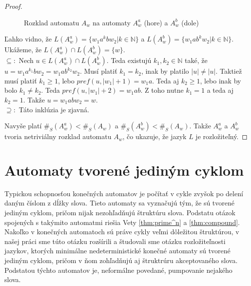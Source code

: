 \begin{proof}
\begin{figure}[H]
\caption{Rozklad automatu $ A_w $ na automaty $ A_w^a $ (hore) a $ A_w^b $ (dole)}
\end{figure}

Ľahko vidno, že $ L(A_w^a) = \lbrace w_1a^kbw_2 | k \in \mathbb{N} \rbrace $ a $ L(A_w^b) = \lbrace w_1ab^kw_2 | k \in \mathbb{N} \rbrace$. Ukážeme, že $ L(A_w^a) \cap L(A_w^b) = \lbrace w \rbrace $. \\ 
$ \subseteq: $ Nech $ u \in L(A_w^a) \cap L(A_w^b)  $. Teda existujú $ k_1,k_2 \in \mathbb{N} $ také, že $ u = w_1a^{k_1}bw_2 = w_1ab^{k_2}w_2 $. Musí platiť $ k_1 = k_2 $, inak by platilo $ |u| \neq |u| $. Taktiež musí platiť $ k_1 \geq 1 $, lebo $ pref(u,|w_1|+1) = w_1a $. Teda aj $ k_2 \geq 1 $, lebo inak by bolo $ k_1 \neq k_2 $. Teda $ pref(u,|w_1|+2) = w_1ab $. Z toho nutne $ k_1 = 1 $ a teda aj $ k_2 = 1 $. Takže $ u = w_1abw_2 = w $. \\
$ \supseteq: $ Táto inklúzia je zjavná.
\par
Navyše platí $ \#_S(A_w^a) < \#_S(A_w) $ a $ \#_S(A_w^b) < \#_S(A_w) $. Takže $ A_w^a $ a $ A_w^b $ tvoria netriviálny rozklad automatu $ A_w $, čo ukazuje, že jazyk $ L $ je rozložiteľný.
\end{proof}

\section{Automaty tvorené jediným cyklom}

Typickou schopnosťou konečných automatov je počítať v cykle zvyšok po delení daným číslom z dĺžky slova. Tieto automaty sa vyznačujú tým, že sú tvorené jediným cyklom, pričom nijak nezohľadňujú štruktúru slova. Podstatu otázok spojených s takýmito automatmi riešia Vety \ref{thm:prime^n} a \ref{thm:compound}. Nakoľko v konečných automatoch sú práve cykly veľmi dôležitou štruktúrou, v našej práci sme túto otázku rozšírili a študovali sme otázku rozložiteľnosti jazykov, ktorých minimálne nedeterministické konečné automaty sú tvorené jediným cyklom, pričom v ňom zohľadňujú aj štruktrúru akceptovaného slova. Podstatou týchto automatov je, neformálne povedané, pumpovanie nejakého slova.


